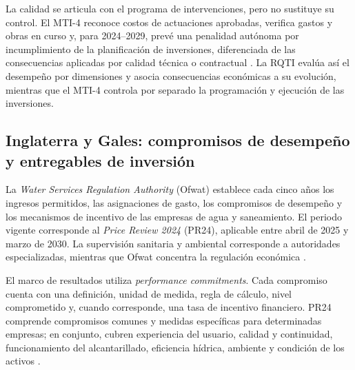 La calidad se articula con el programa de intervenciones, pero no sustituye su control. El MTI-4 reconoce costos de actuaciones aprobadas, verifica gastos y obras en curso y, para 2024--2029, prevé una penalidad autónoma por incumplimiento de la planificación de inversiones, diferenciada de las consecuencias aplicadas por calidad técnica o contractual \citep{ARERA2023MTI4}. La RQTI evalúa así el desempeño por dimensiones y asocia consecuencias económicas a su evolución, mientras que el MTI-4 controla por separado la programación y ejecución de las inversiones.

\subsection{Inglaterra y Gales: compromisos de desempeño y entregables de inversión}
\label{anexo:ofwat}

La \emph{Water Services Regulation Authority} (Ofwat) establece cada cinco años los ingresos permitidos, las asignaciones de gasto, los compromisos de desempeño y los mecanismos de incentivo de las empresas de agua y saneamiento. El periodo vigente corresponde al \emph{Price Review 2024} (PR24), aplicable entre abril de 2025 y marzo de 2030. La supervisión sanitaria y ambiental corresponde a autoridades especializadas, mientras que Ofwat concentra la regulación económica \citep{OfwatIndustryOverview,Ofwat2024Approach}.

El marco de resultados utiliza \emph{performance commitments}. Cada compromiso cuenta con una definición, unidad de medida, regla de cálculo, nivel comprometido y, cuando corresponde, una tasa de incentivo financiero. PR24 comprende compromisos comunes y medidas específicas para determinadas empresas; en conjunto, cubren experiencia del usuario, calidad y continuidad, funcionamiento del alcantarillado, eficiencia hídrica, ambiente y condición de los activos \citep{Ofwat2024Outcomes,Ofwat2025Definitions}.

